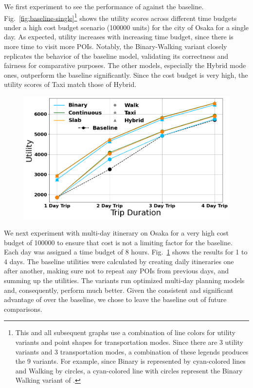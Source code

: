 We first experiment to see the performance of \trip against the baseline.
Fig.~\ref{fig:baseline-single}\footnote{This and all subsequent graphs use a combination of line colors for utility variants and point shapes for transportation modes. Since there are 3 utility variants and 3 transportation modes, a combination of these legends produces the 9 \trip variants. For example, since Binary is represented by cyan-colored lines and Walking by circles, a cyan-colored line with circles represent the Binary Walking variant of \trip.}
shows the utility scores across different time budgets under a high cost budget scenario (100000 units) for the city of Osaka for a single day.
As expected, utility increases with increasing time budget, since there is more time to visit more POIs.
Notably, the \trip Binary-Walking variant closely replicates the behavior of the baseline model, validating its correctness and fairness for comparative purposes. The other models, especially the Hybrid mode ones, outperform the baseline significantly.
Since the cost budget is very high, the utility scores of Taxi match those of Hybrid.


\begin{figure}[t]
\includegraphics[width=\figwidth]{plots/baseline_multiDay.png}
\label{fig:baseline-multi}
\end{figure}

We next experiment with multi-day itinerary on Osaka for a very high cost budget of 100000 to ensure that cost is not a limiting factor for the baseline.
Each day was assigned a time budget of 8 hours.
Fig.~\ref{fig:baseline-multi} shows the results for 1 to 4 days.
The baseline utilities were calculated by creating daily itineraries one after another, making sure not to repeat any POIs from previous days, and summing up the utilities.
The \trip variants run optimized multi-day planning models and, consequently, perform much better. Given the consistent and significant advantage of \trip over the baseline, we chose to leave the baseline out of future comparisons.

